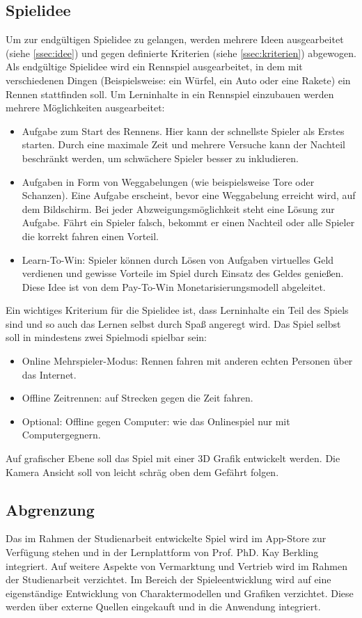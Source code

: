 \subsection{Spielidee}\label{ssec:spielidee}
	Um zur endgültigen Spielidee zu gelangen, werden mehrere Ideen ausgearbeitet (siehe \ref{ssec:idee}) und gegen definierte Kriterien (siehe \ref{ssec:kriterien}) abgewogen.
	Als endgültige Spielidee wird ein Rennspiel ausgearbeitet, in dem mit verschiedenen Dingen (Beispielsweise: ein Würfel, ein Auto oder eine Rakete) ein Rennen stattfinden soll. Um Lerninhalte in ein Rennspiel einzubauen werden mehrere Möglichkeiten ausgearbeitet:
	\begin{itemize}
		\item{ Aufgabe zum Start des Rennens. Hier kann der schnellste Spieler als Erstes starten. Durch eine maximale Zeit und mehrere Versuche kann der Nachteil beschränkt werden, um schwächere Spieler besser zu inkludieren. }
		\item{ Aufgaben in Form von Weggabelungen (wie beispielsweise Tore oder Schanzen). Eine Aufgabe erscheint, bevor eine Weggabelung erreicht wird, auf dem Bildschirm. Bei jeder Abzweigungsmöglichkeit steht eine Lösung zur Aufgabe. Fährt ein Spieler falsch, bekommt er einen Nachteil oder alle Spieler die korrekt fahren einen Vorteil. }
		\item{ Learn-To-Win: Spieler können durch Lösen von Aufgaben virtuelles Geld verdienen und gewisse Vorteile im Spiel durch Einsatz des Geldes genießen. Diese Idee ist von dem Pay-To-Win Monetarisierungsmodell abgeleitet. }
	\end{itemize}
	Ein wichtiges Kriterium für die Spielidee ist, dass Lerninhalte ein Teil des Spiels sind und so auch das Lernen selbst durch Spaß angeregt wird.
	Das Spiel selbst soll in mindestens zwei Spielmodi spielbar sein:
	\begin{itemize}
		\item{ Online Mehrspieler-Modus: Rennen fahren mit anderen echten Personen über das Internet. }
		\item{ Offline Zeitrennen: auf Strecken gegen die Zeit fahren. }
		\item{ Optional: Offline gegen Computer: wie das Onlinespiel nur mit Computergegnern. }
	\end{itemize}
	Auf grafischer Ebene soll das Spiel mit einer 3D Grafik entwickelt werden. Die Kamera Ansicht soll von leicht schräg oben dem Gefährt folgen.

\subsection{Abgrenzung}
	Das im Rahmen der Studienarbeit entwickelte Spiel wird im App-Store zur Verfügung stehen und in der Lernplattform von Prof. PhD. Kay Berkling integriert. Auf weitere Aspekte von Vermarktung und Vertrieb wird im Rahmen der Studienarbeit verzichtet.
	Im Bereich der Spieleentwicklung wird auf eine eigenständige Entwicklung von Charaktermodellen und Grafiken verzichtet. Diese werden über externe Quellen eingekauft und in die Anwendung integriert.

